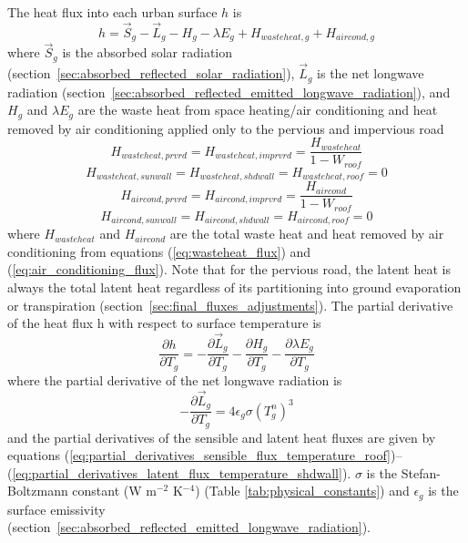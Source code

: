 \documentclass[12pt,authoryear]{elsarticle}
\numberwithin{equation}{section} %
\begin{document}
The heat flux into each urban surface $h$ is
\begin{equation}
h = \overrightarrow{S}_{g}-\overrightarrow{L}_{g} - H_{g}-\lambda E_{g}+H_{wasteheat,g}+H_{aircond,g}
\end{equation}
where $\overrightarrow{S}_{g}$ is the absorbed solar radiation (section~\ref{sec:absorbed_reflected_solar_radiation}), $\overrightarrow{L}_{g}$ is the net longwave radiation (section~\ref{sec:absorbed_reflected_emitted_longwave_radiation}), and $H_{g}$ and $\lambda E_{g}$ are the waste heat from space heating/air conditioning and heat removed by air conditioning applied only to the pervious and impervious road
\begin{equation}
H_{wasteheat,prvrd}=H_{wasteheat,imprvrd}=\frac{H_{wasteheat}}{1-W_{roof}}
\end{equation}
\begin{equation}
H_{wasteheat,sunwall}=H_{wasteheat,shdwall}=H_{wasteheat,roof} = 0
\end{equation}
\begin{equation}
H_{aircond,prvrd} = H_{aircond,imprvrd}=\frac{H_{aircond}}{1-W_{roof}}
\end{equation}
\begin{equation}
H_{aircond,sunwall}=H_{aircond,shdwall}=H_{aircond,roof}=0
\end{equation}
where $H_{wasteheat}$ and $H_{aircond}$ are the total waste heat and heat removed by air conditioning from equations (\ref{eq:wasteheat_flux}) and (\ref{eq:air_conditioning_flux}). Note that for the pervious road, the latent heat is always the total latent heat regardless of its partitioning into ground evaporation or transpiration (section~\ref{sec:final_fluxes_adjustments}). The partial derivative of the heat flux h with respect to surface temperature is 
\begin{equation}
\frac{\partial h}{\partial T_{g}} = -\frac{\partial \overrightarrow{L}_{g}}{\partial T_{g}} - \frac{\partial H_{g}}{\partial T_{g}}- \frac{\partial \lambda E_{g}}{\partial T_{g}}
\end{equation}
where the partial derivative of the net longwave radiation is
\begin{equation}
-\frac{\partial \overrightarrow{L}_{g}}{\partial T_{g}} = 4\epsilon_{g}\sigma(T_{g}^n)^3
\end{equation}
and the partial derivatives of the sensible and latent heat fluxes are given by equations (\ref{eq:partial_derivatives_sensible_flux_temperature_roof})--(\ref{eq:partial_derivatives_latent_flux_temperature_shdwall}). $\sigma$ is the Stefan-Boltzmann constant (W m$^{-2}$ K$^{-4}$) (Table \ref{tab:physical_constants}) and $\epsilon_{g}$ is
the surface emissivity (section~\ref{sec:absorbed_reflected_emitted_longwave_radiation}).
\end{document}
